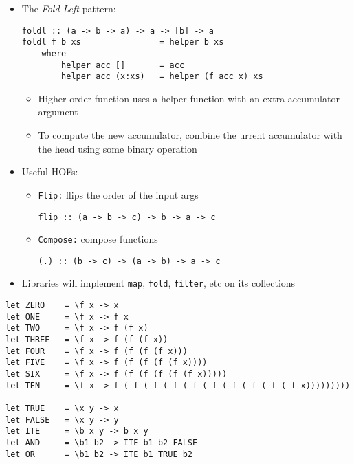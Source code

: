 \documentclass[landscape,8pt]{extarticle}
\newcommand{\code}{\lstinline}
\begin{document}
\begin{multicols}{4}
\begin{itemize}
\begin{itemize}
                \item \code{cat = foldr (\x n -> x ++ n) ""}
            \end{itemize}
            \item The \emph{Fold-Left} pattern:
            \begin{lstlisting}
foldl :: (a -> b -> a) -> a -> [b] -> a
foldl f b xs                = helper b xs
    where
        helper acc []       = acc
        helper acc (x:xs)   = helper (f acc x) xs
            \end{lstlisting}
            \begin{itemize}
                \item Higher order function uses a helper function with an extra accumulator argument
                \item To compute the new accumulator, combine the urrent accumulator with the head using some binary operation
            \end{itemize}
            \item Useful HOFs:
            \begin{itemize}
                \item \code{Flip:} flips the order of the input args
                \begin{lstlisting}
flip :: (a -> b -> c) -> b -> a -> c
                \end{lstlisting}
                \item \code{Compose:} compose functions
                \begin{lstlisting}
(.) :: (b -> c) -> (a -> b) -> a -> c
                \end{lstlisting}
            \end{itemize}
            \item Libraries will implement \code{map}, \code{fold}, \code{filter}, etc on its collections
    \end{itemize}
    \pagebreak
    \begin{center}
        \begin{adjustbox}{angle=270}
            \begin{lstlisting}
let ZERO    = \f x -> x
let ONE     = \f x -> f x
let TWO     = \f x -> f (f x)
let THREE   = \f x -> f (f (f x))
let FOUR    = \f x -> f (f (f (f x)))
let FIVE    = \f x -> f (f (f (f (f x))))
let SIX     = \f x -> f (f (f (f (f (f x)))))
let TEN     = \f x -> f ( f ( f ( f ( f ( f ( f ( f ( f ( f x)))))))))

let TRUE    = \x y -> x
let FALSE   = \x y -> y
let ITE     = \b x y -> b x y
let AND     = \b1 b2 -> ITE b1 b2 FALSE
let OR      = \b1 b2 -> ITE b1 TRUE b2


\end{lstlisting}
\end{adjustbox}
\end{center}
\end{multicols}
\end{document}

